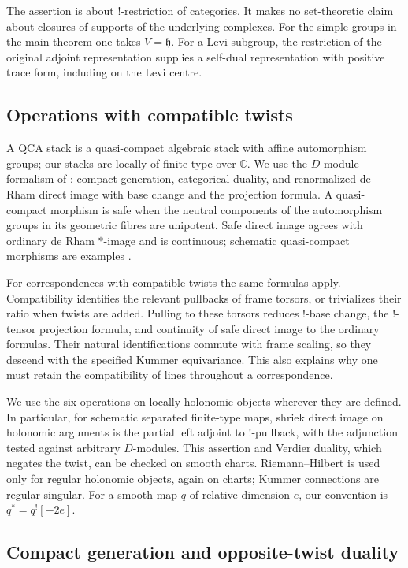 \documentclass[11pt]{article}
\numberwithin{equation}{section}
\theoremstyle{definition}
\theoremstyle{remark}
\begin{document}
The assertion is about $!$-restriction of categories.  It makes no
set-theoretic claim about closures of supports of the underlying
complexes.  For the simple groups in the main theorem one takes
$V=\mathfrak h$.  For a Levi subgroup, the restriction of the original
adjoint representation supplies a self-dual representation with positive
trace form, including on the Levi centre.

\subsection{Operations with compatible twists}\label{foundations:operations}

A QCA stack is a quasi-compact algebraic stack with affine automorphism
groups; our stacks are locally of finite type over $\mathbb C$.
We use the $D$-module formalism of
\cite{DrinfeldGaitsgoryFiniteness}: compact generation, categorical
duality, and renormalized de Rham direct image with base change and the
projection formula.  A quasi-compact morphism is safe when the neutral
components of the automorphism groups in its geometric fibres are
unipotent.  Safe direct image agrees with ordinary de Rham $*$-image and
is continuous; schematic quasi-compact morphisms are examples
\cite[Sections~9--10]{DrinfeldGaitsgoryFiniteness}.

For correspondences with compatible twists the same formulas apply.
Compatibility identifies the relevant pullbacks of frame torsors, or
trivializes their ratio when twists are added.  Pulling to these torsors
reduces $!$-base change, the $!$-tensor projection formula, and continuity
of safe direct image to the ordinary formulas.  Their natural
identifications commute with frame scaling, so they descend with the
specified Kummer equivariance.  This also explains why one must retain
the compatibility of lines throughout a correspondence.

We use the six operations on locally holonomic objects wherever they
are defined.  In particular, for schematic separated finite-type maps,
shriek direct image on holonomic arguments is the partial left adjoint
to $!$-pullback, with the adjunction tested against arbitrary $D$-modules.
This assertion and Verdier duality, which negates the twist, can be
checked on smooth charts.  Riemann--Hilbert is used only for regular
holonomic objects, again on charts; Kummer connections are regular
singular.  For a smooth map $q$ of relative dimension $e$, our convention
is $q^*=q^![-2e]$.

\subsection{Compact generation and opposite-twist duality}
\end{document}
